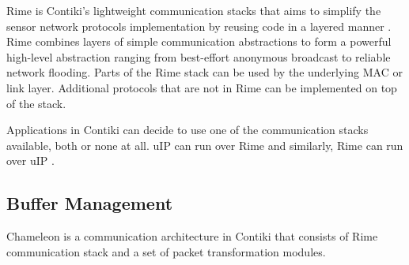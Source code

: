 Rime is Contiki's lightweight communication stacks that aims to simplify the sensor network protocols implementation by reusing code in a layered manner \cite{rimeposter}. Rime combines layers of simple communication abstractions to form a powerful high-level abstraction ranging from best-effort anonymous broadcast to reliable network flooding. Parts of the Rime stack can be used by the underlying MAC or link layer. Additional protocols that are not in Rime can be implemented on top of the stack.

Applications in Contiki can decide to use one of the communication stacks available, both or none at all. uIP can run over Rime and similarly, Rime can run over uIP \cite{contikitutorial}. 





\subsection{Buffer Management}
Chameleon \cite{rime} is a communication architecture in Contiki that consists of Rime communication stack and a set of packet transformation modules. 


